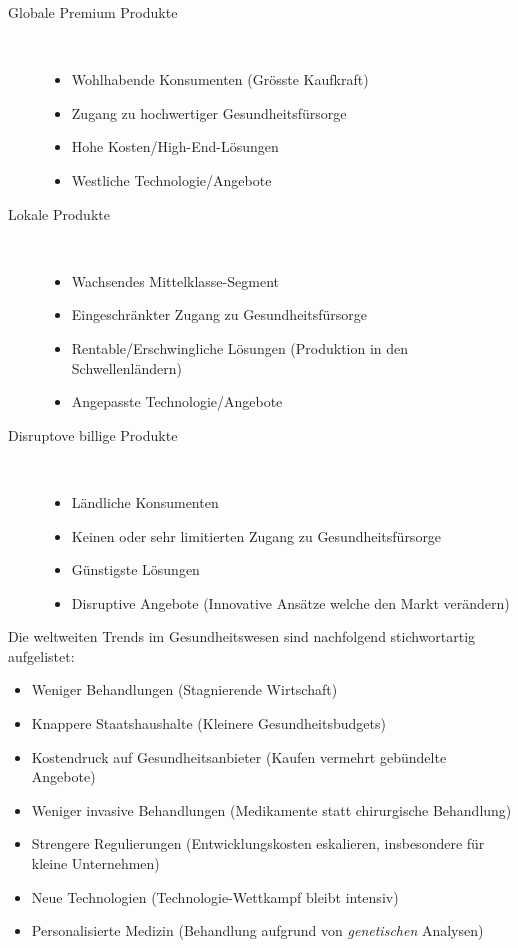 \begin{description}
	\item[Globale Premium Produkte] \hfil \\ 
		\begin{itemize}
			\item Wohlhabende Konsumenten (Grösste Kaufkraft)
			\item Zugang zu hochwertiger Gesundheitsfürsorge
			\item Hohe Kosten/High-End-Lösungen
			\item Westliche Technologie/Angebote
		\end{itemize}
	\item[Lokale Produkte] \hfil \\ 
		\begin{itemize}
			\item Wachsendes Mittelklasse-Segment
			\item Eingeschränkter Zugang zu Gesundheitsfürsorge
			\item Rentable/Erschwingliche Lösungen (Produktion in den Schwellenländern)
			\item Angepasste Technologie/Angebote
		\end{itemize}
	\item[Disruptove billige Produkte] \hfil \\ 
		\begin{itemize}
			\item Ländliche Konsumenten
			\item Keinen oder sehr limitierten Zugang zu Gesundheitsfürsorge
			\item Günstigste Lösungen
			\item Disruptive Angebote (Innovative Ansätze welche den Markt verändern)
		\end{itemize}
\end{description}

Die weltweiten Trends im Gesundheitswesen sind nachfolgend stichwortartig aufgelistet:

\begin{itemize}
	\item Weniger Behandlungen (Stagnierende Wirtschaft)
	\item Knappere Staatshaushalte (Kleinere Gesundheitsbudgets)
	\item Kostendruck auf Gesundheitsanbieter (Kaufen vermehrt gebündelte Angebote)
	\item  Weniger invasive Behandlungen (Medikamente statt chirurgische Behandlung)
	\item Strengere Regulierungen (Entwicklungskosten eskalieren, insbesondere für kleine Unternehmen)
	\item Neue Technologien (Technologie-Wettkampf bleibt intensiv)
	\item Personalisierte Medizin (Behandlung aufgrund von \textit{genetischen} Analysen)
\end{itemize}

